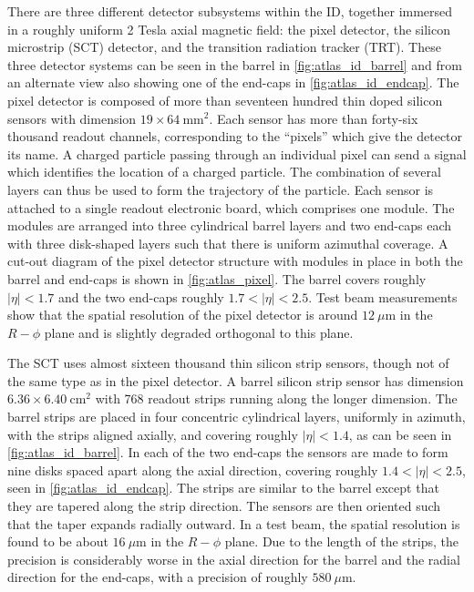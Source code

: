 There are three different detector subsystems within the ID, together
immersed in a roughly uniform 2 Tesla axial magnetic field: the pixel detector,
the silicon microstrip (SCT) detector, and the transition radiation
tracker (TRT). These three detector systems can be seen 
in the barrel in \fig\ref{fig:atlas_id_barrel} and from an alternate
view also showing one of the end-caps in \fig\ref{fig:atlas_id_endcap}. 
The pixel detector
is composed of more than seventeen hundred thin doped silicon sensors with 
dimension $19\times 64~\textrm{mm}^2$. Each sensor has more than forty-six
thousand readout channels,
corresponding to the ``pixels'' which give the detector its name. 
A charged particle passing through an individual pixel can send a signal
which identifies the location of a charged particle. The combination of 
several layers can thus be used to form the trajectory of the particle. %
Each sensor is attached to a single readout electronic board, which comprises
one module.
The modules are arranged into three cylindrical barrel layers and 
two end-caps each with three disk-shaped layers such that there is uniform
azimuthal coverage. A cut-out diagram of the pixel detector 
structure with modules in place in both the barrel and end-caps is shown 
in \fig\ref{fig:atlas_pixel}. The barrel covers roughly 
$|\eta|<1.7$ and the two end-caps roughly $1.7<|\eta|<2.5$.
Test beam measurements show that the 
spatial resolution of the pixel detector is around $12~\mu\textrm{m}$ in 
the $R-\phi$ plane and is slightly degraded orthogonal to this plane.



The SCT uses almost sixteen thousand thin silicon strip sensors, though not of the 
same type as in the pixel detector. 
A barrel silicon strip sensor has dimension $6.36\times 6.40~\textrm{cm}^2$
with 768 readout strips running along the longer dimension. The barrel
strips are placed in four concentric cylindrical layers, uniformly in azimuth,
with the strips aligned axially, and covering roughly
$|\eta|<1.4$, as can be seen in \fig\ref{fig:atlas_id_barrel}.
In each of the two end-caps the sensors are made to form nine
disks spaced apart along the axial 
direction, covering roughly $1.4 < |\eta|<2.5$, 
seen in \fig\ref{fig:atlas_id_endcap}. The strips are similar
to the barrel except that they are tapered along the strip direction.
The sensors are then oriented such that the taper expands radially outward.
In a test beam, the spatial resolution is found to be about $16~\mu\textrm{m}$
in the $R-\phi$ plane. Due to the length of the strips, the precision is considerably
worse in the axial direction for the barrel and the radial direction for 
the end-caps, with a precision of roughly $580~\mu\textrm{m}$.


